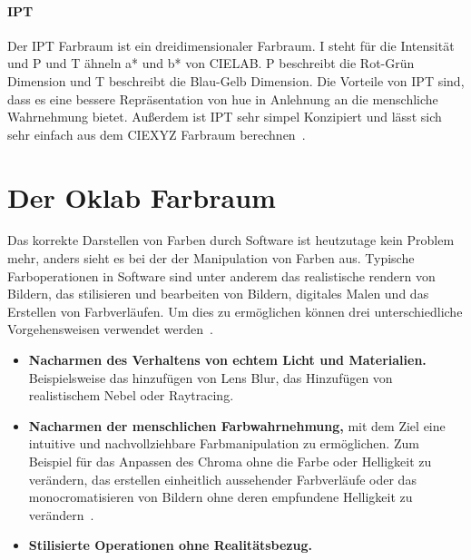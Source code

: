 \documentclass[12pt, a4paper, ngerman]{article}
\begin{document}
\paragraph{IPT}
Der \acs{IPT} Farbraum ist ein dreidimensionaler Farbraum.
I steht für die Intensität und P und T ähneln a* und b* von CIELAB. 
P beschreibt die Rot-Grün Dimension und T beschreibt die Blau-Gelb Dimension.
Die Vorteile von IPT sind, dass es eine bessere Repräsentation von hue 
in Anlehnung an die menschliche Wahrnehmung bietet. 
Außerdem ist IPT sehr simpel Konzipiert und lässt sich sehr einfach aus dem CIEXYZ Farbraum berechnen~\cite{Ebner_1998}.

\section{Der Oklab Farbraum}
Das korrekte Darstellen von Farben durch Software ist heutzutage kein Problem mehr, 
anders sieht es bei der der Manipulation von Farben aus.
Typische Farboperationen in Software sind unter anderem das realistische rendern von Bildern, 
das stilisieren und bearbeiten von Bildern, digitales Malen und das Erstellen von Farbverläufen. 
Um dies zu ermöglichen können drei unterschiedliche Vorgehensweisen verwendet werden~\cite{Ottosson_2020}.
\begin{itemize}
  \item \textbf{Nacharmen des Verhaltens von echtem Licht und Materialien.} Beispielsweise das hinzufügen von Lens Blur, das Hinzufügen von realistischem Nebel oder Raytracing.
  \item \textbf{Nacharmen der menschlichen Farbwahrnehmung,} mit dem Ziel eine intuitive und nachvollziehbare Farbmanipulation zu ermöglichen. Zum Beispiel für das Anpassen des Chroma ohne die Farbe oder Helligkeit zu verändern, das erstellen einheitlich aussehender Farbverläufe oder das monocromatisieren von Bildern ohne deren empfundene Helligkeit zu verändern~\cite{Oklab_2020}.
  \item \textbf{Stilisierte Operationen ohne Realitätsbezug.} 
\end{itemize}
\end{document}
